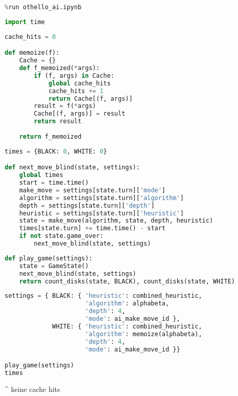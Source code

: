\begin{lstlisting}[language=Python]
%run othello_game.ipynb
%run othello_ai.ipynb
\end{lstlisting}

\begin{lstlisting}[language=Python]
import time
\end{lstlisting}

\begin{lstlisting}[language=Python]
cache_hits = 0

def memoize(f):
    Cache = {}
    def f_memoized(*args):
        if (f, args) in Cache:
            global cache_hits
            cache_hits += 1
            return Cache[(f, args)]
        result = f(*args)
        Cache[(f, args)] = result
        return result
    
    return f_memoized
\end{lstlisting}

\begin{lstlisting}[language=Python]
times = {BLACK: 0, WHITE: 0}

def next_move_blind(state, settings):
    global times
    start = time.time()
    make_move = settings[state.turn]['mode']
    algorithm = settings[state.turn]['algorithm']
    depth = settings[state.turn]['depth']
    heuristic = settings[state.turn]['heuristic']
    state = make_move(algorithm, state, depth, heuristic)
    times[state.turn] += time.time() - start
    if not state.game_over:
        next_move_blind(state, settings)
\end{lstlisting}

\begin{lstlisting}[language=Python]
def play_game(settings):
    state = GameState()
    next_move_blind(state, settings)
    return count_disks(state, BLACK), count_disks(state, WHITE)
\end{lstlisting}

\begin{lstlisting}[language=Python]
settings = { BLACK: { 'heuristic': combined_heuristic,
                      'algorithm': alphabeta,
                      'depth': 4,
                      'mode': ai_make_move_id },
             WHITE: { 'heuristic': combined_heuristic,
                      'algorithm': memoize(alphabeta),
                      'depth': 4,
                      'mode': ai_make_move_id }}

play_game(settings)
times
\end{lstlisting}

\^{} keine cache hits


